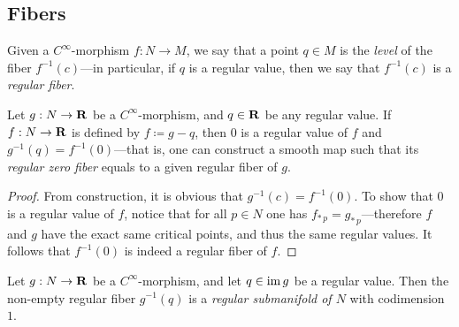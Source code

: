 \subsection{Fibers}

\begin{definition}
\label{def:fibers-and-levels}
Given a \(C^{\infty}\)-morphism \(f: N \to M\), we say that a point \(q \in M\)
is the \emph{level} of the fiber \(f^{-1}(c)\)---in particular, if \(q\) is a
regular value, then we say that \(f^{-1}(c)\) is a \emph{regular fiber}.
\end{definition}

\begin{lemma}
\label{lem:regular-fiber-equal-zero-regular-fiber}
Let \(g: N \to \mathbf{R}\) be a \(C^{\infty}\)-morphism, and \(q \in \mathbf{R}\) be any
regular value. If \(f: N \to \mathbf{R}\) is defined by \(f \coloneq g - q\), then
\(0\) is a regular value of \(f\) and \(g^{-1}(q) = f^{-1}(0)\)---that is, one
can construct a smooth map such that its \emph{regular zero fiber} equals to a
given regular fiber of \(g\).
\end{lemma}

\begin{proof}
From construction, it is obvious that \(g^{-1}(c) = f^{-1}(0)\). To show that
\(0\) is a regular value of \(f\), notice that for all \(p \in N\) one has
\(f_{*\, p} = g_{*\, p}\)---therefore \(f\) and \(g\) have the exact same
critical points, and thus the same regular values. It follows that \(f^{-1}(0)\)
is indeed a regular fiber of \(f\).
\end{proof}

\begin{lemma}
\label{lem:regular-fibers-are-regular-manifolds}
Let \(g: N \to \mathbf{R}\) be a \(C^{\infty}\)-morphism, and let \(q \in \operatorname{im} g\) be a
regular value. Then the non-empty regular fiber \(g^{-1}(q)\) is a \emph{regular
  submanifold of \(N\)} with codimension \(1\).
\end{lemma}

